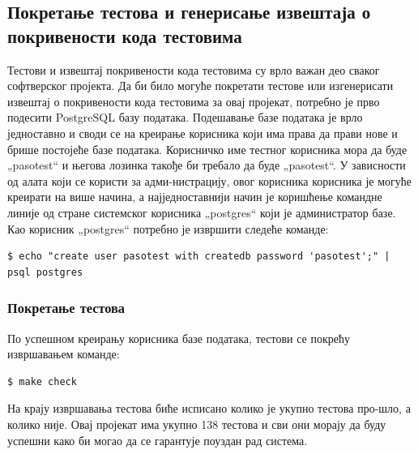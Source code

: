 \documentclass[a4paper, 12pt, diplomski]{etfcyr}
\def\quote#1{„#1“}
\begin{document}
			\newpage

			\subsection[Покретање тестова и извештај о покривености кода]{Покретање тестова и генерисање извештаја о покривености кода тестовима}
				\begin{justify}
					Тестови и извештај покривености кода тестовима су врло важан део сваког софтверског пројекта. Да би било могуће покретати тестове или изгенерисати извештај о покривености кода тестовима за овај пројекат, потребно је прво подесити PostgreSQL базу података. Подешавање базе података је врло једноставно и своди се на креирање корисника који има права да прави нове и брише постојеће базе података. Корисничко име тестног корисника мора да буде \quote{pasotest} и његова лозинка такође би требало да буде \quote{pasotest}. У зависности од алата који се користи за адми-нистрацију, овог корисника корисника је могуће креирати на више начина, а најједноставнији начин је коришћење командне линије од стране системског корисника \quote{postgres} који је администратор базе. Као корисник \quote{postgres} потребно је извршити следеће команде:
					\begin{footnotesize}
						\begin{verbatim}
$ echo "create user pasotest with createdb password 'pasotest';" | psql postgres
						\end{verbatim}
					\end{footnotesize}
				\end{justify}
				
				\subsubsection*{Покретање тестова}
					\begin{justify}
						По успешном креирању корисника базе података, тестови се покрећу извршавањем команде:
						\begin{footnotesize}
							\begin{verbatim}
$ make check
							\end{verbatim}
						\end{footnotesize}
						На крају извршавања тестова биће исписано колико је укупно тестова про-шло, а колико није. Овај пројекат има укупно 138 тестова и сви они морају да буду успешни како би могао да се гарантује поуздан рад система.
					\end{justify}
\end{document}
